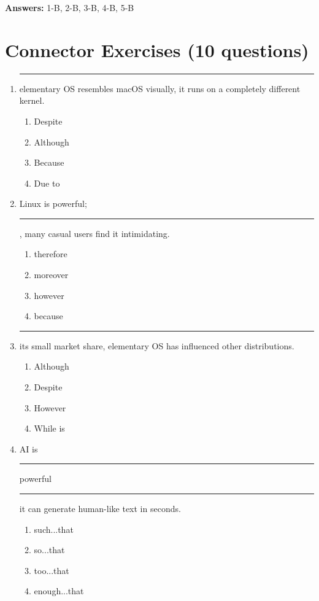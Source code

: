 \documentclass[10pt,a4paper]{article}
\begin{document}
\textbf{Answers:} 1-B, 2-B, 3-B, 4-B, 5-B

\section*{Connector Exercises (10 questions)}

\begin{enumerate}[label=\textbf{\arabic*.}, leftmargin=*]

\item \rule{2cm}{0.4pt} elementary OS resembles macOS visually, it
runs on a completely different kernel.
\begin{enumerate}[label=(\Alph*)]
\item Despite \item Although \item Because \item Due to
\end{enumerate}

\item Linux is powerful; \rule{2cm}{0.4pt}, many casual users find
it intimidating.
\begin{enumerate}[label=(\Alph*)]
\item therefore \item moreover \item however \item because
\end{enumerate}

\item \rule{2cm}{0.4pt} its small market share, elementary OS has
influenced other distributions.
\begin{enumerate}[label=(\Alph*)]
\item Although \item Despite \item However \item While is
\end{enumerate}

\item AI is \rule{2cm}{0.4pt} powerful \rule{2cm}{0.4pt} it can
generate human-like text in seconds.
\begin{enumerate}[label=(\Alph*)]
\item such...that \item so...that \item too...that \item enough...that
\end{enumerate}


\end{enumerate}
\end{document}
